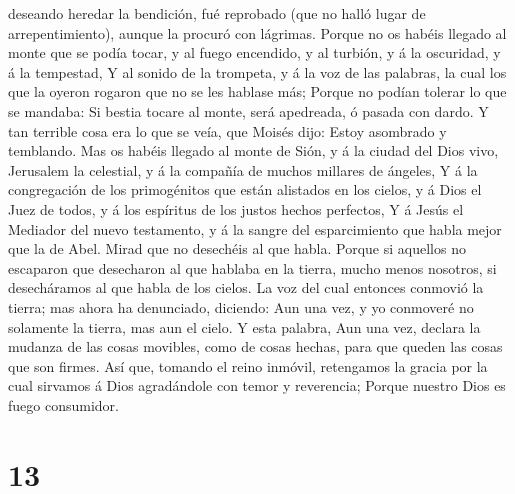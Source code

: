 deseando heredar la bendición, fué reprobado (que no halló lugar de
arrepentimiento), aunque la procuró con lágrimas.  Porque
no os habéis llegado al monte que se podía tocar, y al fuego encendido,
y al turbión, y á la oscuridad, y á la tempestad,  Y al
sonido de la trompeta, y á la voz de las palabras, la cual los que la
oyeron rogaron que no se les hablase más;  Porque no
podían tolerar lo que se mandaba: Si bestia tocare al monte, será
apedreada, ó pasada con dardo.  Y tan terrible cosa era
lo que se veía, que Moisés dijo: Estoy asombrado y temblando.
 Mas os habéis llegado al monte de Sión, y á la ciudad
del Dios vivo, Jerusalem la celestial, y á la compañía de muchos
millares de ángeles,  Y á la congregación de los
primogénitos que están alistados en los cielos, y á Dios el Juez de
todos, y á los espíritus de los justos hechos perfectos, 
Y á Jesús el Mediador del nuevo testamento, y á la sangre del
esparcimiento que habla mejor que la de Abel.  Mirad que
no desechéis al que habla. Porque si aquellos no escaparon que
desecharon al que hablaba en la tierra, mucho menos nosotros, si
desecháramos al que habla de los cielos.  La voz del cual
entonces conmovió la tierra; mas ahora ha denunciado, diciendo: Aun una
vez, y yo conmoveré no solamente la tierra, mas aun el cielo.
 Y esta palabra, Aun una vez, declara la mudanza de las
cosas movibles, como de cosas hechas, para que queden las cosas que son
firmes.  Así que, tomando el reino inmóvil, retengamos la
gracia por la cual sirvamos á Dios agradándole con temor y reverencia;
 Porque nuestro Dios es fuego consumidor.

\hypertarget{section-12}{%
\section{13}\label{section-12}}

